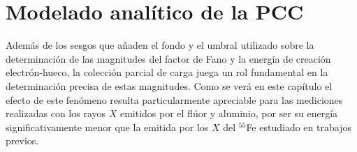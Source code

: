 \chapter{Modelado analítico de la PCC \label{chap:ModeloPCC}}
\noindent Además de los sesgos que añaden el fondo y el umbral utilizado sobre la determinación de las magnitudes del factor de Fano y la energía de creación electrón-hueco, la colección parcial de carga juega un rol fundamental en la determinación precisa de estas magnitudes. Como se verá en este capítulo el efecto de este fenómeno resulta particularmente apreciable para las mediciones realizadas con los rayos $X$ emitidos por el flúor y aluminio, por ser su energía significativamente menor que la emitida por los $X$ del $^{55}$Fe estudiado en trabajos previos\cite{TesisAndi,TesisKevin,Rodrigues}.

